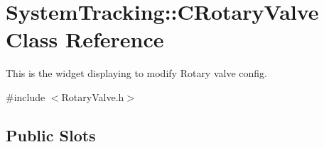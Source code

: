 \hypertarget{classSystemTracking_1_1CRotaryValve}{\section{\-System\-Tracking\-:\-:\-C\-Rotary\-Valve \-Class \-Reference}
\label{classSystemTracking_1_1CRotaryValve}
}


\-This is the widget displaying to modify \-Rotary valve config.  




{\ttfamily \#include $<$\-Rotary\-Valve.\-h$>$}

\subsection*{\-Public \-Slots}
